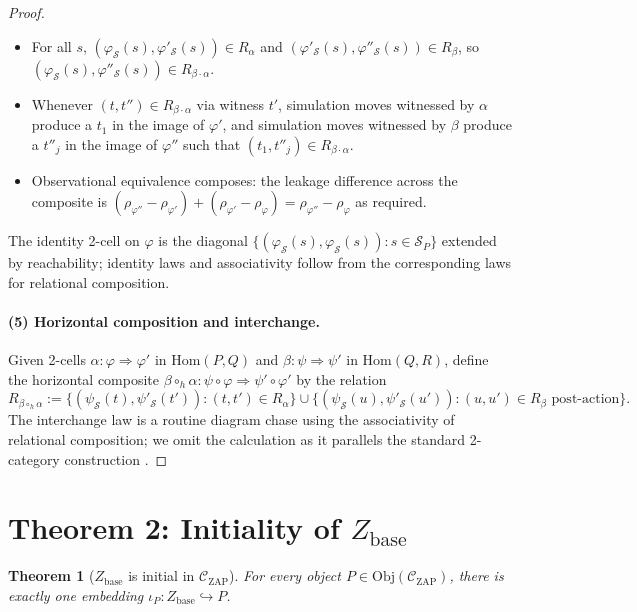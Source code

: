 \documentclass[11pt]{article}
\newtheorem{theorem}{Theorem}
\theoremstyle{definition}
\theoremstyle{remark}
\newcommand{\CZ}{\mathcal{C}_{\mathrm{ZAP}}}
\newcommand{\Zb}{Z_{\mathrm{base}}}
\begin{document}
\begin{proof}
\begin{itemize}
\item For all $s$, $(\varphi_\mathcal{S}(s), \varphi'_\mathcal{S}(s))
\in R_\alpha$ and $(\varphi'_\mathcal{S}(s),
\varphi''_\mathcal{S}(s)) \in R_\beta$, so
$(\varphi_\mathcal{S}(s), \varphi''_\mathcal{S}(s)) \in R_{\beta \cdot
\alpha}$.
\item Whenever $(t, t'') \in R_{\beta \cdot \alpha}$ via witness
$t'$, simulation moves witnessed by $\alpha$ produce a $t_1$ in the
image of $\varphi'$, and simulation moves witnessed by $\beta$
produce a $t''_j$ in the image of $\varphi''$ such that $(t_1,
t''_j) \in R_{\beta \cdot \alpha}$.
\item Observational equivalence composes: the leakage difference
across the composite is $(\rho_{\varphi''} - \rho_{\varphi'}) +
(\rho_{\varphi'} - \rho_\varphi) = \rho_{\varphi''} - \rho_\varphi$
as required.
\end{itemize}

The identity 2-cell on $\varphi$ is the diagonal
$\{(\varphi_\mathcal{S}(s), \varphi_\mathcal{S}(s)) : s \in
\mathcal{S}_P\}$ extended by reachability; identity laws and
associativity follow from the corresponding laws for relational
composition.

\paragraph{(5) Horizontal composition and interchange.}
Given 2-cells $\alpha : \varphi \Rightarrow \varphi'$ in
$\mathrm{Hom}(P, Q)$ and $\beta : \psi \Rightarrow \psi'$ in
$\mathrm{Hom}(Q, R)$, define the horizontal composite
$\beta \circ_h \alpha : \psi \circ \varphi \Rightarrow \psi' \circ
\varphi'$ by the relation
\[
R_{\beta \circ_h \alpha} := \{(\psi_\mathcal{S}(t),
\psi'_\mathcal{S}(t')) : (t, t') \in R_\alpha\}
\cup \{(\psi_\mathcal{S}(u), \psi'_\mathcal{S}(u')) : (u, u') \in
R_\beta \text{ post-action}\}.
\]
The interchange law is a routine diagram chase using the
associativity of relational composition; we omit the calculation as
it parallels the standard 2-category construction
\cite[Ch.~XII.3]{maclane1998categories}.
\end{proof}

\section{Theorem 2: Initiality of $\Zb$}
\label{sec:init-proof}

\begin{theorem}[$\Zb$ is initial in $\CZ$]
\label{thm:init-proof}
For every object $P \in \mathrm{Obj}(\CZ)$, there is exactly one
embedding $\iota_P : \Zb \hookrightarrow P$.
\end{theorem}
\end{document}
